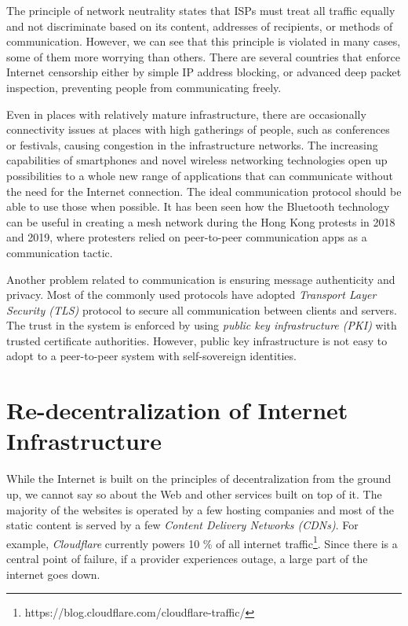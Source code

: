 The principle of network neutrality states that ISPs must treat all traffic equally and not discriminate based on its content, addresses of recipients, or methods of communication. However, we can see that this principle is violated in many cases, some of them more worrying than others. There are several countries that enforce Internet censorship either by simple IP address blocking, or advanced deep packet inspection, preventing people from communicating freely.

Even in places with relatively mature infrastructure, there are occasionally connectivity issues at places with high gatherings of people, such as conferences or festivals, causing congestion in the infrastructure networks. The increasing capabilities of smartphones and novel wireless networking technologies open up possibilities to a whole new range of applications that can communicate without the need for the Internet connection. The ideal communication protocol should be able to use those when possible. It has been seen how the Bluetooth technology can be useful in creating a mesh network during the Hong Kong protests in 2018 and 2019, where protesters relied on peer-to-peer communication apps as a communication tactic.

Another problem related to communication is ensuring message authenticity and privacy. Most of the commonly used protocols have adopted \textit{Transport Layer Security (TLS)} protocol to secure all communication between clients and servers. The trust in the system is enforced by using \textit{public key infrastructure (PKI)} with trusted certificate authorities. However, public key infrastructure is not easy to adopt to a peer-to-peer system with self-sovereign identities.

\iffalse
\section{Re-decentralization of Internet Infrastructure}

While the Internet is built on the principles of decentralization from the ground up, we cannot say so about the Web and other services built on top of it. The majority of the websites is operated by a few hosting companies and most of the static content is served by a few \textit{Content Delivery Networks (CDNs)}. For example, \textit{Cloudflare} currently powers 10 \% of all internet traffic\footnote{https://blog.cloudflare.com/cloudflare-traffic/}. Since there is a central point of failure, if a provider experiences outage, a large part of the internet goes down.

